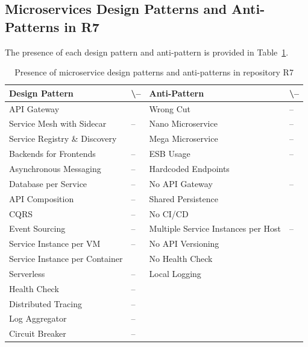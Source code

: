 \documentclass{Configuration_Files/PoliMi3i_thesis}
\newcommand{\cmark}{\ding{51}}%
\begin{document}
\subsection{Microservices Design Patterns and Anti-Patterns in R7}
\label{subsec:R7_detection}

The presence of each design pattern and anti-pattern is provided in Table~\ref{table:R7_result}.

\begin{table}[H]
\centering 
    \begin{tabular}{ 
  | >{\centering\arraybackslash} m{16em} 
  | >{\centering\arraybackslash} m{2.2em} 
  | >{\centering\arraybackslash} m{16em} 
  | >{\centering\arraybackslash} m{2.2em} | }
    \hline
    \rowcolor{bluepoli!40}
    \textbf{Design Pattern} & \cmark \textbackslash – & \textbf{Anti-Pattern} & \cmark \textbackslash – \T\B \\
    \hline \hline
    API Gateway & \cmark & Wrong Cut & – \T\B\\
    \hline
    \rowcolor{bluepoli!10}
    Service Mesh with Sidecar & – & Nano Microservice & – \T\B \\
    \hline
    Service Registry \& Discovery & \cmark & Mega Microservice & – \T\B \\
    \hline
    \rowcolor{bluepoli!10}
    Backends for Frontends & – & ESB Usage & – \T\B \\
    \hline
    Asynchronous Messaging & – & Hardcoded Endpoints & \cmark \T\B \\
    \hline
    \rowcolor{bluepoli!10}
    Database per Service & – & No API Gateway & – \T\B \\
    \hline
    API Composition & – & Shared Persistence & \cmark \T\B \\
    \hline
    \rowcolor{bluepoli!10}
    CQRS & – & No CI/CD & \cmark \T\B \\
    \hline
    Event Sourcing & – & Multiple Service Instances per Host & – \T\B \\
    \hline
    \rowcolor{bluepoli!10}
    Service Instance per VM & – & No API Versioning & \cmark \T\B \\
    \hline
    Service Instance per Container & \cmark & No Health Check & \cmark \T\B \\
    \hline
    \rowcolor{bluepoli!10}
    Serverless & – & Local Logging & \cmark \T\B \\
    \hline
    Health Check & – &  & \T\B \\
    \hline
    \rowcolor{bluepoli!10}
    Distributed Tracing & – & & \T\B \\
    \hline
    Log Aggregator & – &  & \T\B \\
    \hline
    \rowcolor{bluepoli!10}
    Circuit Breaker & – &  & \T\B \\
    \hline
    \end{tabular}
    \\[10pt]
    \caption{Presence of microservice design patterns and anti-patterns in repository R7}
    \label{table:R7_result}
\end{table}
\end{document}
